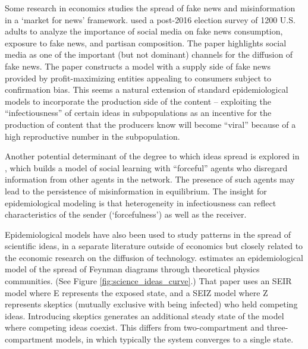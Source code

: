 Some research in economics studies the spread of fake news and misinformation in a `market for news' framework.  \href{https://github.com/iworld1991/EpiExp/blob/master/Literature/allcott2017social.pdf}{\cite{allcott2017social}} used a post-2016 election survey of 1200 U.S. adults to analyze the importance of social media on fake news consumption, exposure to fake news, and partisan composition. The paper highlights social media as one of the important (but not dominant) channels for the diffusion of fake news.  The paper constructs a model with a supply side of fake news provided by profit-maximizing entities appealing to consumers subject to confirmation bias. This seems a natural extension of standard epidemiological models to incorporate the production side of the content -- exploiting the ``infectiousness'' of certain ideas in subpopulations as an incentive for the production of content that the producers know will become ``viral'' because of a high reproductive number in the subpopulation.

Another potential determinant of the degree to which ideas spread is explored in \href{https://www.kdd.org/exploration_files/8._CR.10.Misinformation_in_social_media_-_Final.pdf}{\cite{acemoglu2010spread}}, which builds a model of social learning with ``forceful'' agents who disregard information from other agents in the network.  The presence of such agents may lead to the persistence of misinformation in equilibrium. The insight for epidemiological modeling is that heterogeneity in infectiousness can reflect characteristics of the sender (`forcefulness') as well as the receiver.

Epidemiological models have also been used to study patterns in the spread of scientific ideas, in a separate literature outside of economics but closely related to the economic research on the diffusion of technology.   \href{https://github.com/iworld1991/EpiExp/blob/master/Literature/bettencourt2006power.pdf}{\cite{bettencourt2006power}} estimates an epidemiological model of the spread of Feynman diagrams through theoretical physics communities. (See Figure \ref{fig:science_ideas_curve}.) That paper uses an SEIR model where E represents the exposed state, and a SEIZ model where Z represents skeptics (mutually exclusive with being infected) who held competing ideas. Introducing skeptics generates an additional steady state of the model where competing ideas coexist. This differs from two-compartment and three-compartment models, in which typically the system converges to a single state.

